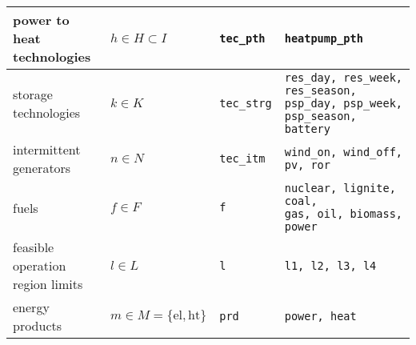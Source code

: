 \documentclass[11pt,a4paper]{article}
\begin{document}
\begin{tabular}{l l l l}
\makecell[l]{power to heat \\ technologies} & $h \in H \subset I$ & \texttt{tec\_pth} & \texttt{heatpump\_pth}  \\ \hline

\makecell[l]{storage \\technologies} & $k \in K$ & \texttt{tec\_strg} & \makecell[l]{
	\texttt{res\_day, res\_week, res\_season,} \\ 
	\texttt{psp\_day, psp\_week, psp\_season,} \\
	\texttt{battery}
	} \\ \hline

\makecell[l]{intermittent \\generators} & $n \in N$ & \texttt{tec\_itm} & \texttt{wind\_on, wind\_off, pv, ror}\\ \hline

fuels & $f \in F$ & \texttt{f} & \makecell[l]{\texttt{nuclear, lignite, coal,} \\ \texttt{gas, oil, biomass, power}} \\ \hline

\makecell[l]{feasible operation \\region limits}& $l \in L$ & \texttt{l} & \texttt{l1, l2, l3, l4} \\ \hline

energy products & $m \in M=\{\text{el}, \text{ht}\}$ & \texttt{prd} & \texttt{power, heat} \\ \hline \hline
\end{tabular}
\end{document}
